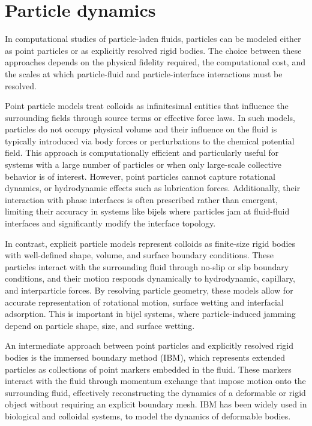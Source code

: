 \section{Particle dynamics}

In computational studies of particle-laden fluids, particles can be modeled either as point particles or as explicitly resolved rigid bodies. The choice between 
these approaches depends on the physical fidelity required, the computational cost, and the scales at which particle-fluid and particle-interface interactions must be resolved.

Point particle models treat colloids as infinitesimal entities that influence the surrounding fields through source terms or effective force laws. 
\cite{mehrabadi_direct_2018, prosperetti_point-particle_2007, frohlich_validation_2018}
In such models, 
particles do not occupy physical volume and their influence on the fluid is typically introduced via body forces or perturbations to the chemical potential field. This 
approach is computationally efficient and particularly useful for systems with a large number of particles or when only large-scale collective behavior is of interest. 
However, point particles cannot capture rotational dynamics, or hydrodynamic effects such as lubrication forces. Additionally, 
their interaction with phase interfaces is often prescribed rather than emergent, limiting their accuracy in systems like bijels where particles jam at fluid-fluid interfaces 
and significantly modify the interface topology.

In contrast, explicit particle models represent colloids as finite-size rigid bodies with well-defined shape, volume, and surface boundary conditions. 
\cite{ladd_numerical_1994, jansen_bijels_2011,gunther_timescales_2014}
These particles interact 
with the surrounding fluid through no-slip or slip boundary conditions, and their motion responds dynamically to hydrodynamic, capillary, and interparticle forces. By resolving 
particle geometry, these models allow for accurate representation of rotational motion, surface wetting and interfacial adsorption.
\cite{jansen_bijels_2011, gunther_lattice_2013}
This is important in bijel systems, where particle-induced jamming depend on particle shape, size, and surface wetting. 

An intermediate approach between point particles and explicitly resolved rigid bodies is the immersed boundary method (IBM), which represents extended particles as collections of 
point markers embedded in the fluid. \cite{peskin_immersed_2002, luo_immersed-boundary_2008, spandan_parallel_2017}
These markers interact with the fluid through momentum exchange that impose motion onto the surrounding fluid, effectively reconstructing 
the dynamics of a deformable or rigid object without requiring an explicit boundary mesh. \cite{peskin_immersed_2002, luo_immersed-boundary_2008, spandan_parallel_2017} 
IBM has been widely used in biological and colloidal systems, to model the dynamics of deformable bodies. \cite{peskin_immersed_2002, luo_immersed-boundary_2008, spandan_parallel_2017}

